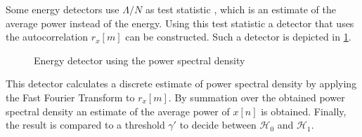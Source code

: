 \documentclass[a4paper, openany, oneside]{memoir}
\begin{document}
Some energy detectors use $\Lambda/N$ as test statistic \cite{chang2008sensing}, which is an estimate of the average power instead of the energy. Using this test statistic a detector that uses the autocorrelation $r_x[m]$ can be constructed. Such a detector is depicted in \cref{tkz:ed_psd}.
\begin{figure}[H]
\centering
{}
\caption{Energy detector using the power spectral density}
\label{tkz:ed_psd}
\end{figure}
This detector calculates a discrete estimate of power spectral density by applying the Fast Fourier Transform to $r_x[m]$. By summation over the obtained power spectral density an estimate of the average power of $x[n]$ is obtained. Finally, the result is compared to a threshold $\gamma'$  to decide between $\mathcal{H}_0$ and $\mathcal{H}_1$. 
\end{document}
